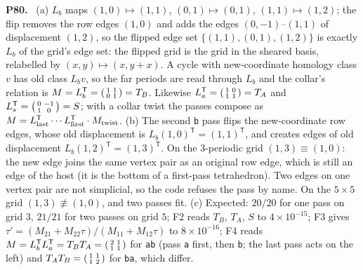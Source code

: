 \documentclass[11pt]{article}
\newenvironment{solution}[1]{\medskip\noindent\textbf{P#1.}\ }{\par\medskip}
\begin{document}
\begin{solution}{80}
(a) $L_b$ maps $(1,0)\mapsto(1,1)$, $(0,1)\mapsto(0,1)$, $(1,1)\mapsto(1,2)$;
the flip removes the row edges $(1,0)$ and adds the edges $(0,-1)$--$(1,1)$ of
displacement $(1,2)$, so the flipped edge set $\{(1,1),(0,1),(1,2)\}$ is exactly
$L_b$ of the grid's edge set: the flipped grid is the grid in the sheared
basis, relabelled by $(x,y)\mapsto(x,y+x)$. A cycle with new-coordinate
homology class $v$ has old class $L_bv$, so the far periods are read through
$L_b$ and the collar's relation is $M = L_b^{\mathsf T} = \begin{psmallmatrix}1&1\\0&1\end{psmallmatrix} = T_B$.
Likewise $L_a^{\mathsf T} = \begin{psmallmatrix}1&0\\1&1\end{psmallmatrix} = T_A$ and
$L_s^{\mathsf T} = \begin{psmallmatrix}0&-1\\1&0\end{psmallmatrix} = S$; with a
collar twist the passes compose as $M = L_{\rm last}^{\mathsf T}\cdots L_{\rm first}^{\mathsf T}\cdot M_{\rm twist}$.
(b) The second \texttt{b} pass flips the new-coordinate row edges, whose old
displacement is $L_b(1,0)^{\mathsf T} = (1,1)^{\mathsf T}$, and creates edges of old
displacement $L_b(1,2)^{\mathsf T} = (1,3)^{\mathsf T}$. On the $3$-periodic grid
$(1,3)\equiv(1,0)$: the new edge joins the same vertex pair as an original row
edge, which is still an edge of the host (it is the bottom of a first-pass
tetrahedron). Two edges on one vertex pair are not simplicial, so the code
refuses the pass by name. On the $5\times5$ grid $(1,3)\not\equiv(1,0)$, and two
passes fit.
(c) Expected: $20/20$ for one pass on grid $3$, $21/21$ for two passes on
grid $5$; F2 reads $T_B$, $T_A$, $S$ to $4\times10^{-15}$; F3 gives
$\tau' = (M_{21}+M_{22}\tau)/(M_{11}+M_{12}\tau)$ to $8\times10^{-16}$; F4 reads
$M = L_b^{\mathsf T}L_a^{\mathsf T} = T_BT_A = \begin{psmallmatrix}2&1\\1&1\end{psmallmatrix}$
for \texttt{ab} (pass \texttt{a} first, then \texttt{b}; the last pass acts
on the left) and $T_AT_B = \begin{psmallmatrix}1&1\\1&2\end{psmallmatrix}$ for
\texttt{ba}, which differ.
\end{solution}
\end{document}
